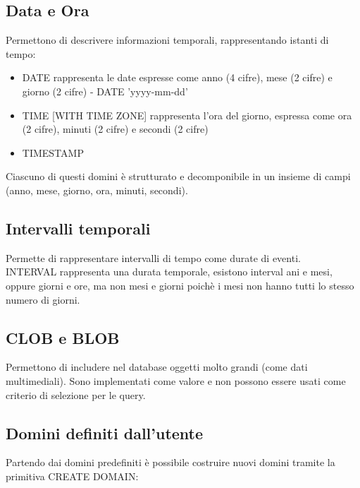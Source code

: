 \subsection{Data e Ora}
Permettono di descrivere informazioni temporali, rappresentando istanti di tempo:
\begin{itemize}
  \item DATE rappresenta le date espresse come anno (4 cifre), mese (2 cifre) e giorno (2 cifre)
  - DATE 'yyyy-mm-dd'
  \item TIME [WITH TIME ZONE] rappresenta l'ora del giorno, espressa come ora (2 cifre), 
  minuti (2 cifre) e secondi (2 cifre)
  \item TIMESTAMP
\end{itemize}
Ciascuno di questi domini è strutturato e decomponibile in un insieme di campi 
(anno, mese, giorno, ora, minuti, secondi).
\subsection{Intervalli temporali}
Permette di rappresentare intervalli di tempo come durate di eventi.\\
INTERVAL rappresenta una durata temporale, esistono interval ani e mesi, oppure
giorni e ore, ma non mesi e giorni poichè i mesi non hanno tutti lo stesso numero di
giorni.
\subsection*{CLOB e BLOB}
Permettono di includere nel database oggetti molto grandi (come dati multimediali).
Sono implementati come valore e non possono essere usati come criterio di selezione per le
query.
\subsection*{Domini definiti dall'utente}
Partendo dai domini predefiniti è possibile costruire nuovi domini tramite la
primitiva CREATE DOMAIN: